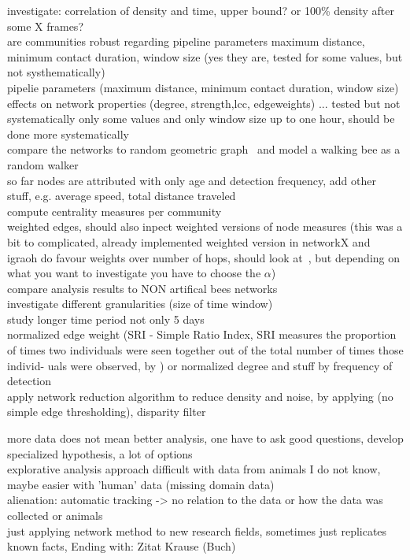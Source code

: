 investigate: correlation of density and time, upper bound? or 100\% density after some X frames?\\
are communities robust regarding pipeline parameters maximum distance, minimum contact duration, window size (yes they are, tested for some values, but not systhematically)\\
pipelie parameters (maximum distance, minimum contact duration, window size) effects on network properties (degree, strength,lcc, edgeweights) ... tested but not systematically only some values and only window size up to one hour, should be done more systematically\\
compare the networks to random geometric graph~\cite{rgg2002} and model a walking bee as a random walker\\
so far nodes are attributed with only age and detection frequency, add other stuff, e.g. average speed, total distance traveled\\
compute centrality measures per community\\
weighted edges, should also inpect weighted versions of node measures (this was a bit to complicated, already implemented weighted version in networkX and igraoh do favour weights over number of hops, should look at~\textcite{opsahl2010node}, but depending on what you want to investigate you have to choose the $\alpha$)\\
compare analysis results to NON artifical bees networks\\
investigate different granularities (size of time window)\\
study longer time period not only 5 days\\
normalized edge weight (SRI - Simple Ratio Index, SRI measures
the proportion of times two individuals were seen
together out of the total number of times those individ-
uals were observed, by \textcite{croft2008exploring}) or normalized degree and stuff by frequency of detection\\
apply network reduction algorithm to reduce density and noise, by applying (no simple edge thresholding), disparity filter~\textcite{serrano2009extracting}

\vspace{2cm}
more data does not mean better analysis, one have to ask good questions, develop specialized hypothesis, a lot of options\\
explorative analysis approach difficult with data from animals I do not know, maybe easier with 'human' data (missing domain data)\\
alienation: automatic tracking -> no relation to the data or how the data was collected or animals\\
just applying network method to new research fields, sometimes just replicates known facts, Ending with: Zitat Krause (Buch)